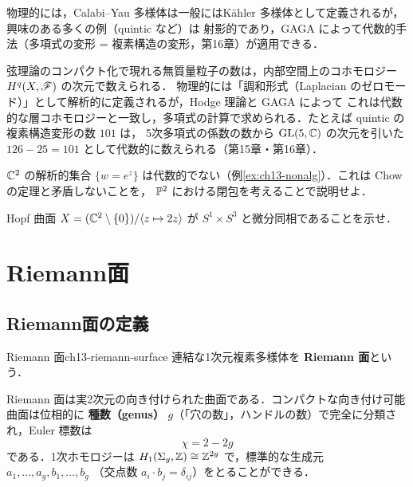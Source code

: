 物理的には，Calabi--Yau 多様体は一般にはKähler 多様体として定義されるが，興味のある多くの例（quintic など）は
射影的であり，GAGA によって代数的手法（多項式の変形 = 複素構造の変形，第16章）が適用できる．

\begin{physbox}[代数と解析の往来]
弦理論のコンパクト化で現れる無質量粒子の数は，内部空間上のコホモロジー $H^q(X,\mathscr{F})$ の次元で数えられる．
物理的には「調和形式（Laplacian のゼロモード）」として解析的に定義されるが，Hodge 理論と GAGA によって
これは代数的な層コホモロジーと一致し，多項式の計算で求められる．たとえば quintic の複素構造変形の数 $101$ は，
5次多項式の係数の数から $\operatorname{GL}(5,\mathbb{C})$ の次元を引いた $126-25=101$ として代数的に数えられる（第15章・第16章）．
\end{physbox}

$\mathbb{C}^2$ の解析的集合 $\{w=e^z\}$ は代数的でない（例\ref{ex:ch13-nonalg}）．これは Chow の定理と矛盾しないことを，
$\mathbb{P}^2$ における閉包を考えることで説明せよ．

Hopf 曲面 $X=(\mathbb{C}^2\setminus\{0\})/\langle z\mapsto 2z\rangle$ が $S^1\times S^3$ と微分同相であることを示せ．

\section{Riemann面}

\subsection{Riemann面の定義}

\begin{mydef}{Riemann 面}{ch13-riemann-surface}
連結な1次元複素多様体を \textbf{Riemann 面}という．
\end{mydef}

Riemann 面は実2次元の向き付けられた曲面である．コンパクトな向き付け可能曲面は位相的に
\textbf{種数（genus）} $g$（「穴の数」，ハンドルの数）で完全に分類され，Euler 標数は
\begin{equation}
  \chi = 2-2g
\end{equation}
である．1次ホモロジーは $H_1(\Sigma_g,\mathbb{Z})\cong\mathbb{Z}^{2g}$ で，標準的な生成元 $a_1,\dots,a_g,b_1,\dots,b_g$
（交点数 $a_i\cdot b_j=\delta_{ij}$）をとることができる．

